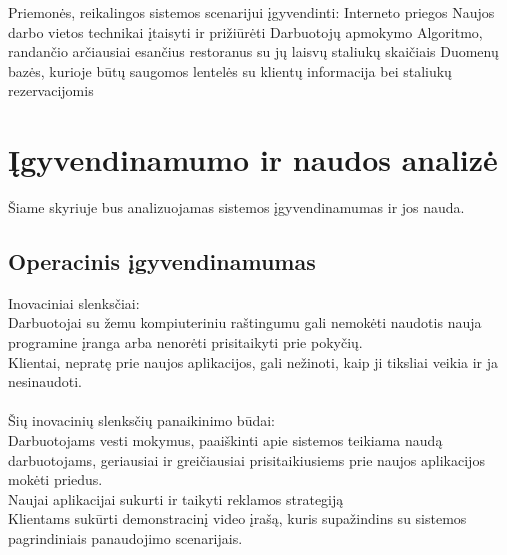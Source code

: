 \documentclass{VUMIFPSkursinis}
\begin{document}
Priemonės, reikalingos sistemos scenarijui įgyvendinti:
Interneto priegos
Naujos darbo vietos technikai įtaisyti ir prižiūrėti
Darbuotojų apmokymo
Algoritmo, randančio arčiausiai esančius restoranus su jų laisvų staliukų skaičiais
Duomenų bazės, kurioje būtų saugomos lentelės su klientų informacija bei staliukų rezervacijomis

 \section{Įgyvendinamumo ir naudos analizė}
Šiame skyriuje bus analizuojamas sistemos įgyvendinamumas ir jos nauda.
\subsection{Operacinis įgyvendinamumas}
Inovaciniai slenksčiai:\\
Darbuotojai su žemu kompiuteriniu raštingumu gali nemokėti naudotis nauja programine įranga arba
nenorėti prisitaikyti prie pokyčių.\\
Klientai, nepratę prie naujos aplikacijos, gali nežinoti, kaip ji tiksliai veikia ir ja nesinaudoti.\\
\\
Šių inovacinių slenksčių panaikinimo būdai:\\
Darbuotojams vesti mokymus, paaiškinti apie sistemos teikiama naudą darbuotojams, geriausiai ir
greičiausiai prisitaikiusiems prie naujos aplikacijos mokėti priedus.\\
Naujai aplikacijai sukurti ir taikyti reklamos strategiją\\
Klientams sukūrti demonstracinį video įrašą, kuris supažindins su sistemos pagrindiniais panaudojimo scenarijais.
\end{document}
